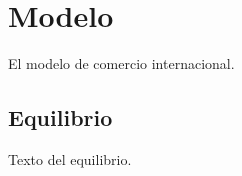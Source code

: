 \section{Modelo}
El modelo de comercio internacional.
\subsection{Equilibrio}
Texto del equilibrio.
